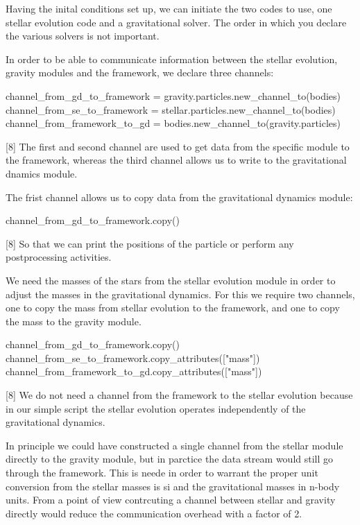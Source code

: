 Having the inital conditions set up, we can initiate the two codes to
use, one stellar evolution code and a gravitational solver.  The order
in which you declare the various solvers is not important.

In order to be able to communicate information between the stellar
evolution, gravity modules and the framework, we declare three
channels:
\begin{verbatimtab}[8]
    channel_from_gd_to_framework = gravity.particles.new_channel_to(bodies)
    channel_from_se_to_framework = stellar.particles.new_channel_to(bodies)
    channel_from_framework_to_gd = bodies.new_channel_to(gravity.particles)
\end{verbatimtab}[8]
The first and second channel are used to get data from the specific
module to the framework, whereas the third channel allows us to write
to the gravitational dnamics module.

The frist channel allows us to copy data from the gravitational dynamics module:
\begin{verbatimtab}[8]
        channel_from_gd_to_framework.copy()
\end{verbatimtab}[8]
So that we can print the positions of the particle or perform any
postprocessing activities.

We need the masses of the stars from the stellar evolution module in
order to adjust the masses in the gravitational dynamics.  For this we
require two channels, one to copy the mass from stellar evolution to
the framework, and one to copy the mass to the gravity module.

\begin{verbatimtab}[8]
        channel_from_gd_to_framework.copy()
        channel_from_se_to_framework.copy_attributes(["mass"])
        channel_from_framework_to_gd.copy_attributes(["mass"])
\end{verbatimtab}[8]
We do not need a channel from the framework to the stellar evolution
because in our simple script the stellar evolution operates
independently of the gravitational dynamics.

In principle we could have constructed a single channel from the
stellar module directly to the gravity module, but in parctice the
data stream would still go through the framework. This is neede in
order to warrant the proper unit conversion from the stellar masses is
si and the gravitational masses in n-body units.  From a point of view
contrcuting a channel between stellar and gravity directly would
reduce the communication overhead with a factor of 2.

